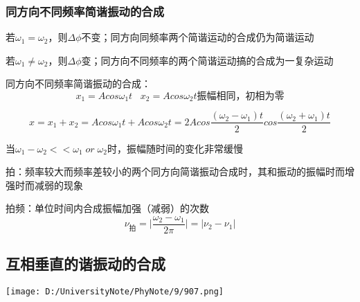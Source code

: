 \documentclass[UTF8]{article}
\begin{document}
\subsubsection{同方向不同频率简谐振动的合成}

    若$\omega_1 = \omega_2$，则$\Delta \phi$不变；同方向同频率两个简谐运动的合成仍为简谐运动

    若$\omega_1 \neq \omega_2$，则$\Delta \phi$变；同方向不同频率的两个简谐运动搞的合成为一复杂运动

    同方向不同频率简谐振动的合成：
    \[x_1 = Acos\omega_1 t\;\;\;x_2 = Acos\omega_2 t\mbox{振幅相同，初相为零}\]

    \[x = x_1 + x_2 = Acos\omega_1 t + Acos\omega_2 t = 2Acos\frac{(\omega_2 - \omega_1)t}{2}cos\frac{(\omega_2 + \omega_1)t}{2}\]

    当$\omega_1 - \omega_2<<\omega_1\; or \;\omega_2$时，振幅随时间的变化非常缓慢

    拍：频率较大而频率差较小的两个同方向简谐振动合成时，其和振动的振幅时而增强时而减弱的现象

    拍频：单位时间内合成振幅加强（减弱）的次数
    \[\nu_{\mbox{拍}} = \vert \frac{\omega_2 - \omega_1}{2\pi} \lvert = \vert \nu_2 - \nu_1 \lvert\]

\subsection{互相垂直的谐振动的合成}

    \texttt{[image: D:/UniversityNote/PhyNote/9/907.png]}
\end{document}
